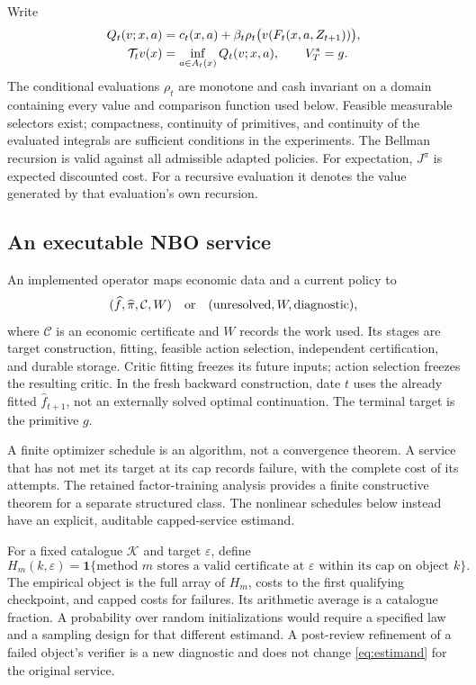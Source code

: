 \documentclass[ecta,nameyear,draft]{econsocart}
\begin{document}
Write
\begin{align}\label{eq:bellman}
 Q_t(v;x,a)&=c_t(x,a)+\beta_t\rho_t\bigl(v(F_t(x,a,Z_{t+1}))\bigr),\\
 \mathcal T_tv(x)&=\inf_{a\in A_t(x)}Q_t(v;x,a),\qquad V_T^*=g.\notag
\end{align}
The conditional evaluations $\rho_t$ are monotone and cash invariant on a domain containing every value and comparison function used below. Feasible measurable selectors exist; compactness, continuity of primitives, and continuity of the evaluated integrals are sufficient conditions in the experiments. The Bellman recursion is valid against all admissible adapted policies. For expectation, $J^\pi$ is expected discounted cost. For a recursive evaluation it denotes the value generated by that evaluation's own recursion.

\subsection{An executable NBO service}
An implemented operator maps economic data and a current policy to
\[
 (\widehat f,\widehat\pi,\mathcal C,W)\quad\hbox{or}\quad
 (\mathrm{unresolved},W,\mathrm{diagnostic}),
\]
where $\mathcal C$ is an economic certificate and $W$ records the work used. Its stages are target construction, fitting, feasible action selection, independent certification, and durable storage. Critic fitting freezes its future inputs; action selection freezes the resulting critic. In the fresh backward construction, date $t$ uses the already fitted $\widehat f_{t+1}$, not an externally solved optimal continuation. The terminal target is the primitive $g$.

A finite optimizer schedule is an algorithm, not a convergence theorem. A service that has not met its target at its cap records failure, with the complete cost of its attempts. The retained factor-training analysis provides a finite constructive theorem for a separate structured class. The nonlinear schedules below instead have an explicit, auditable capped-service estimand.

For a fixed catalogue $\mathcal K$ and target $\varepsilon$, define
\begin{equation}\label{eq:estimand}
 H_m(k,\varepsilon)=\mathbf1\{\text{method $m$ stores a valid certificate
 at $\varepsilon$ within its cap on object $k$}\}.
\end{equation}
The empirical object is the full array of $H_m$, costs to the first qualifying checkpoint, and capped costs for failures. Its arithmetic average is a catalogue fraction. A probability over random initializations would require a specified law and a sampling design for that different estimand. A post-review refinement of a failed object's verifier is a new diagnostic and does not change \eqref{eq:estimand} for the original service.
\end{document}
